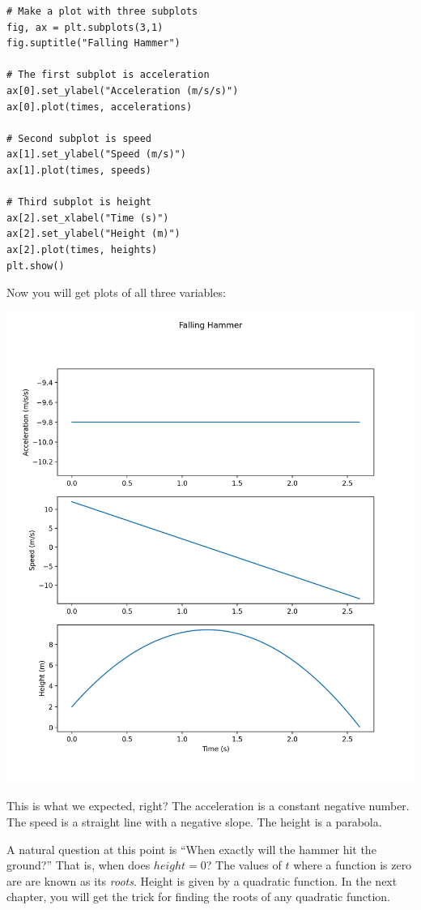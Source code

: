 \begin{Verbatim}
# Make a plot with three subplots
fig, ax = plt.subplots(3,1)
fig.suptitle("Falling Hammer")

# The first subplot is acceleration
ax[0].set_ylabel("Acceleration (m/s/s)")
ax[0].plot(times, accelerations)

# Second subplot is speed
ax[1].set_ylabel("Speed (m/s)")
ax[1].plot(times, speeds)

# Third subplot is height
ax[2].set_xlabel("Time (s)")
ax[2].set_ylabel("Height (m)")
ax[2].plot(times, heights)
plt.show()
\end{Verbatim}

Now you will get plots of all three variables:

\includegraphics[width=0.8\linewidth]{stackedplot.png}

This is what we expected, right?  The acceleration is a constant negative number.  The speed is a
straight line with a negative slope.  The height is a parabola.

A natural question at this point is ``When exactly will the hammer hit the
ground?''  That is, when does $height = 0$? The values of $t$ where a function is zero are
are known as its \textit{roots}. Height is given by a quadratic function. In the next
chapter, you will get the trick for finding the roots of any quadratic
function.
